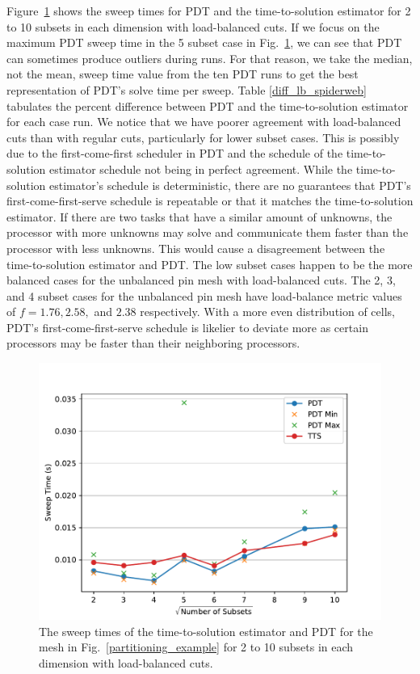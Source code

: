 \documentclass[times,final]{elsarticle}
\begin{document}
Figure~\ref{comp_lb_spiderweb} shows the sweep times for PDT and the time-to-solution estimator for 2 to 10 subsets in each dimension with load-balanced cuts.
If we focus on the maximum PDT sweep time in the 5 subset case in Fig.~\ref{comp_lb_spiderweb}, we can see that PDT can sometimes produce outliers during runs.
For that reason, we take the median, not the mean, sweep time value from the ten PDT runs to get the best representation of PDT's solve time per sweep.
Table \ref{diff_lb_spiderweb} tabulates the percent difference between PDT and the time-to-solution estimator for each case run.
We notice that we have poorer agreement with load-balanced cuts than with regular cuts, particularly for lower subset cases.
This is possibly due to the first-come-first scheduler in PDT and the schedule of the time-to-solution estimator schedule not being in perfect agreement.
While the time-to-solution estimator's schedule is deterministic, there are no guarantees that PDT's first-come-first-serve schedule is repeatable or that it matches the time-to-solution estimator.
If there are two tasks that have a similar amount of unknowns, the processor with more unknowns may solve and communicate them faster than the processor with less unknowns.
This would cause a disagreement between the time-to-solution estimator and PDT.
The low subset cases happen to be the more balanced cases for the unbalanced pin mesh with load-balanced cuts.
The 2, 3, and 4 subset cases for the unbalanced pin mesh have load-balance metric values of $f = 1.76, 2.58,$ and $2.38$ respectively.
With a more even distribution of cells, PDT's first-come-first-serve schedule is likelier to deviate more as certain processors may be faster than their neighboring processors.
\begin{figure}[!ht]
  \centering
  \includegraphics[scale=0.75]{../figures/spiderweb_lb_pdtvtts.pdf}
  \caption{The sweep times of the time-to-solution estimator and PDT for the mesh in Fig.~\ref{partitioning_example} for 2 to 10 subsets in each dimension with load-balanced cuts.}
\label{comp_lb_spiderweb}
\end{figure}
\end{document}

